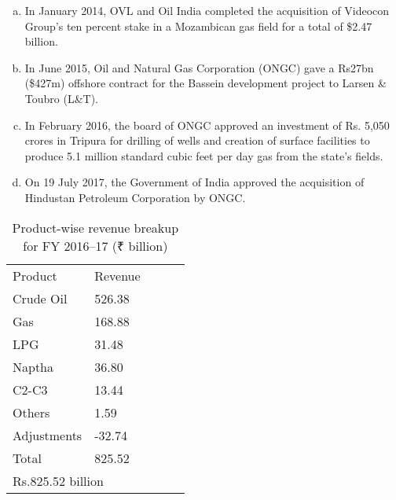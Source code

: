 \begin{enumerate}
\begin{enumerate}[(a)]
\item In January 2014, OVL and Oil India completed the acquisition of Videocon Group's ten percent stake in a Mozambican gas field for a total of \$2.47 billion.

\item In June 2015, Oil and Natural Gas Corporation (ONGC) gave a Rs27bn (\$427m) offshore contract for the Bassein development project to Larsen \& Toubro (L\&T).

\item In February 2016, the board of ONGC approved an investment of Rs. 5,050 crores in Tripura for drilling of wells and creation of surface facilities to produce 5.1 million standard cubic feet per day gas from the state's fields.

\item On 19 July 2017, the Government of India approved the acquisition of Hindustan Petroleum Corporation by ONGC.

\end{enumerate}


\end{enumerate}





 
 
\begin{table}[]
\begin{tabular}{|l|l|lll}
\cline{1-2}
Product              & Revenue          &  &  &  \\ \cline{1-2}
Crude Oil            & 526.38           &  &  &  \\ \cline{1-2}
Gas                  & 168.88           &  &  &  \\ \cline{1-2}
LPG                  & 31.48            &  &  &  \\ \cline{1-2}
Naptha               & 36.80            &  &  &  \\ \cline{1-2}
C2-C3                & 13.44            &  &  &  \\ \cline{1-2}
Others               & 1.59             &  &  &  \\ \cline{1-2}
Adjustments          & -32.74           &  &  &  \\ \cline{1-2}
Total                & 825.52           &  &  &  \\ \cline{1-2}
\multicolumn{2}{|l|}{Rs.825.52 billion} &  &  &  \\ \cline{1-2}
\end{tabular}

\caption{Product-wise revenue breakup for FY 2016–17 (₹ billion)}
\end{table}


